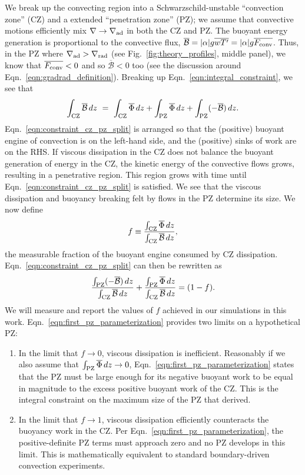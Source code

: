 \documentclass[twocolumn]{aastex631}
\newcommand{\gradrad}{\ensuremath{\nabla_{\rm{rad}}}}
\newcommand{\gradad}{\ensuremath{\nabla_{\rm{ad}}}}
\newcommand{\justgrad}{\ensuremath{\nabla}}
\newcommand{\Fconv}{\ensuremath{F_{\rm{conv}}}}
\renewcommand{\bar}[1]{\overline{#1}}
\begin{document}
We break up the convecting region into a Schwarzschild-unstable ``convection zone'' (CZ) and a extended ``penetration zone'' (PZ); we assume that convective motions efficiently mix $\justgrad \rightarrow \gradad$ in both the CZ and PZ.
The buoyant energy generation is proportional to the convective flux, $\bar{\mathcal{B}} = |\alpha|g\bar{w T'} = |\alpha| g \bar{\Fconv}$.
Thus, in the PZ where $\gradad > \gradrad$ (see Fig.~\ref{fig:theory_profiles}, middle panel), we know that $\bar{\Fconv} < 0$ and so $\bar{\mathcal{B}} < 0$ too (see the discussion around Eqn.~\ref{eqn:gradrad_definition}).
Breaking up Eqn.~\ref{eqn:integral_constraint}, we see that
\begin{equation}
\int_{\rm{CZ}} \bar{\mathcal{B}}\,dz \,\,=\,\,
\int_{\rm{CZ}} \bar{\Phi}\,dz + \int_{\rm{PZ}} \bar{\Phi}\,dz + \int_{\rm{PZ}}(-\bar{\mathcal{B}})\,dz.
\label{eqn:constraint_cz_pz_split}
\end{equation}
Eqn.~\ref{eqn:constraint_cz_pz_split} is arranged so that the (positive) buoyant engine of convection is on the left-hand side, and the (positive) sinks of work are on the RHS.
If viscous dissipation in the CZ does not balance the buoyant generation of energy in the CZ, the kinetic energy of the convective flows grows, resulting in a penetrative region.
This region grows with time until Eqn.~\ref{eqn:constraint_cz_pz_split} is satisfied.
We see that the viscous dissipation and buoyancy breaking felt by flows in the PZ determine its size.
We now define
\begin{equation}
f \equiv \frac{\int_{\rm{CZ}} \bar{\Phi}\,dz}{\int_{\rm{CZ}}\bar{\mathcal{B}}\,dz},
\label{eqn:f_defn}
\end{equation}
the measurable fraction of the buoyant engine consumed by CZ dissipation.
Eqn.~\ref{eqn:constraint_cz_pz_split} can then be rewritten as
\begin{equation}
\frac{\int_{\rm{PZ}}(-\bar{\mathcal{B}})\,dz}{\int_{\rm{CZ}} \bar{\mathcal{B}}\,dz}
+ \frac{\int_{\rm{PZ}} \bar{\Phi}\,dz }{\int_{\rm{CZ}} \bar{\mathcal{B}}\,dz}
= (1 - f).
\label{eqn:first_pz_parameterization}
\end{equation}
We will measure and report the values of $f$ achieved in our simulations in this work.
Eqn.~\ref{eqn:first_pz_parameterization} provides two limits on a hypothetical PZ:
\begin{enumerate}
\item In the limit that $f \rightarrow 0$, viscous dissipation is inefficient.
Reasonably if we also assume that $\int_{\rm{PZ}}\bar{\Phi}\,dz \rightarrow 0$, Eqn.~\ref{eqn:first_pz_parameterization} states that the PZ must be large enough for its negative buoyant work to be equal in magnitude to the excess positive buoyant work of the CZ.
This is the integral constraint on the maximum size of the PZ that \citet{roxburgh1989} derived.
\item In the limit that $f \rightarrow 1$, viscous dissipation efficiently counteracts the buoyancy work in the CZ.
Per Eqn.~\ref{eqn:first_pz_parameterization}, the positive-definite PZ terms must approach zero and no PZ develops in this limit.
This is mathematically equivalent to standard boundary-driven convection experiments.
\end{enumerate}
\end{document}
